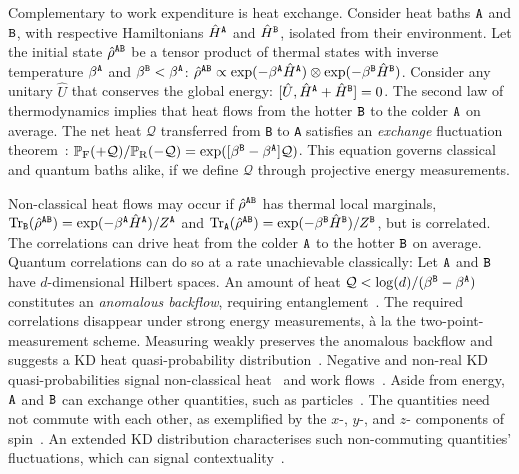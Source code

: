 \documentclass[%
 reprint,
superscriptaddress,
nofootinbib,
bibnotes,
 amsmath,amssymb,
 aps,
]{revtex4-1}
\theoremstyle{plain}
\DeclareMathOperator{\Tr}{Tr}
\begin{document}
Complementary to work expenditure is heat exchange. Consider heat baths ${\tt A}$ and ${\tt B}$, with respective Hamiltonians $\hat{H}^{\tt A}$ and $\hat{H}^{\tt B}$, isolated from their environment.
Let the initial state $\hat{\rho}^{\tt AB}$ be
a tensor product of thermal states
with inverse temperature $\beta^{\tt A}$ and $\beta^{\tt B} < \beta^{\tt A}$: $\hat{\rho}^{\tt AB} \propto \exp( - \beta^{\tt A} \hat{H}^{\tt A})\otimes \exp( - \beta^{\tt B} \hat{H}^{\tt B})$. 
Consider any unitary $\hat{U}$ that conserves the global energy: $[\hat{U}, \hat{H}^{\tt A} + \hat{H}^{\tt B}]=0$.
The second law of thermodynamics implies that heat flows from the hotter ${\tt B}$ to the colder ${\tt A}$ on average.
The net heat $\mathcal{Q}$ transferred from {\tt B} to {\tt A} satisfies an \emph{exchange} fluctuation theorem~\cite{Jarzynski2004}: 
${\mathbb{P}_{\rm F}(+\mathcal{Q})}  /  {\mathbb{P}_{\rm R}(-\mathcal{Q})} 
= \exp([\beta^{\tt B} - \beta^{\tt A}] \mathcal{Q})$.
This equation governs classical and quantum baths alike, if we define $\mathcal{Q}$ through projective energy measurements.


Non-classical heat flows may occur if $\hat{\rho}^{\tt AB}$ has thermal local 
marginals, $\Tr_{\tt B}( \hat{\rho}^{\tt AB})= \exp(- \beta^{\tt A} \hat{H}^{\tt A})/Z^{\tt A}$ and $\Tr_{\tt A}( \hat{\rho}^{\tt AB})= \exp( - \beta^{\tt B} \hat{H}^{\tt B})/Z^{\tt B}$, but
is correlated.
The correlations can drive heat from the colder ${\tt A}$ to the hotter ${\tt B}$ on average.
Quantum correlations can do so at a rate unachievable classically:
Let ${\tt A}$ and ${\tt B}$ have $d$-dimensional Hilbert spaces.
An amount of heat $\mathcal{Q} < \log(d) / (\beta^{\tt B} - \beta^{\tt A})$ constitutes an \emph{anomalous backflow}, requiring entanglement~\cite{Jennings_entanglement_2010, Jevtic_exchange_2015}. 
The required correlations disappear under strong energy measurements, \`a la the two-point-measurement scheme.
Measuring weakly preserves the anomalous backflow and suggests a KD heat quasi-probability distribution~\cite{Levy_quasiprobability_2020}. 
Negative and non-real KD quasi-probabilities signal non-classical heat~\cite{Levy_quasiprobability_2020} 
and work flows~\cite{Hernandez-Gomez_projective_2022}.
Aside from energy, 
${\tt A}$ and ${\tt B}$ can exchange other quantities, such as particles~\cite{majidy_noncommuting_2023}. 
The quantities need not commute with each other, as exemplified by the $x$-, $y$-, and $z$- components of spin~\cite{Yunger_Halpern_noncommuting_2020}.
An extended KD distribution characterises such non-commuting quantities' fluctuations, which can signal contextuality~\cite{Upadhyaya_what_2023}. 
\end{document}

